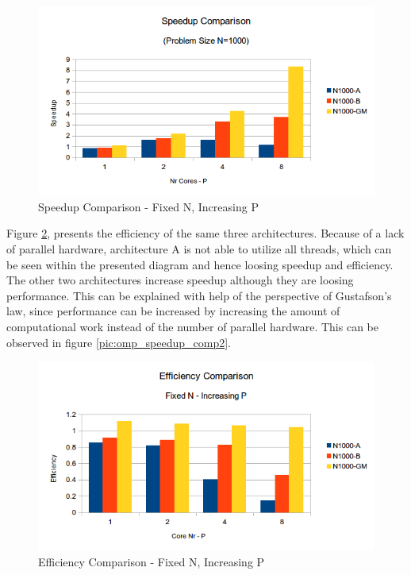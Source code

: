 \documentclass[conference]{IEEEtran}
\begin{document}
\begin{figure}[h]
  \centering
  \includegraphics[scale=0.55]{pic/omp_speedup_comp.png} 
  \caption{Speedup Comparison - Fixed N, Increasing P}
  \label{pic:omp_speedup_comp}
\end{figure}

Figure \ref{pic:omp_efficiency_comp}, presents the efficiency of the same three architectures. Because of a lack of parallel hardware, architecture A is not able to utilize all threads, which can be seen within the presented diagram and hence loosing speedup and efficiency. The other two architectures increase speedup although they are loosing performance. This can be explained with help of the perspective of Gustafson’s law, since performance can be increased by increasing the amount of computational work instead of the number of parallel hardware. This can be observed in figure \ref{pic:omp_speedup_comp2}. 

\begin{figure}[h]
  \centering
  \includegraphics[scale=0.55]{pic/omp_efficiency_comp.png} 
  \caption{Efficiency Comparison - Fixed N, Increasing P}
  \label{pic:omp_efficiency_comp}
\end{figure}
\end{document}
